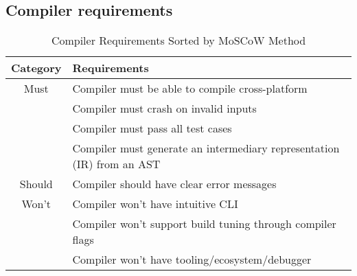 \subsection{Compiler requirements} %

\begin{table}[ht]
\centering
\begin{tabular}{|c|l|}
\hline
\rowcolor{gray!50}
\textbf{Category} & \textbf{Requirements} \\
\hline \rule{0pt}{10pt}
Must & Compiler must be able to compile cross-platform \\
     & Compiler must crash on invalid inputs \\
     & Compiler must pass all test cases \\
     & Compiler must generate an intermediary representation (IR) from an AST \\
\hline \rule{0pt}{10pt}
Should & Compiler should have clear error messages \\
\hline \rule{0pt}{10pt}
Won't & Compiler won't have intuitive CLI \\
      & Compiler won't support build tuning through compiler flags \\
      & Compiler won't have tooling/ecosystem/debugger \\
\hline
\end{tabular}
\caption{Compiler Requirements Sorted by MoSCoW Method}
\end{table}

\newpage

